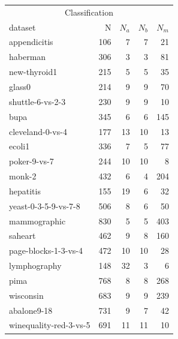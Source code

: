 \begin{tabular}{l@{\hspace{16pt}}r@{\hspace{16pt}}r@{\hspace{16pt}}r@{\hspace{16pt}}r}
\toprule
\multicolumn{5}{c}{Classification} \\
dataset & N & $N_a$ & $N_b$ & $N_m$ \\
\midrule
appendicitis & 106 & 7 & 7 & 21 \\
haberman & 306 & 3 & 3 & 81 \\
new-thyroid1 & 215 & 5 & 5 & 35 \\
glass0 & 214 & 9 & 9 & 70 \\
shuttle-6-vs-2-3 & 230 & 9 & 9 & 10 \\
bupa & 345 & 6 & 6 & 145 \\
cleveland-0-vs-4 & 177 & 13 & 10 & 13 \\
ecoli1 & 336 & 7 & 5 & 77 \\
poker-9-vs-7 & 244 & 10 & 10 & 8 \\
monk-2 & 432 & 6 & 4 & 204 \\
hepatitis & 155 & 19 & 6 & 32 \\
yeast-0-3-5-9-vs-7-8 & 506 & 8 & 6 & 50 \\
mammographic & 830 & 5 & 5 & 403 \\
saheart & 462 & 9 & 8 & 160 \\
page-blocks-1-3-vs-4 & 472 & 10 & 10 & 28 \\
lymphography & 148 & 32 & 3 & 6 \\
pima & 768 & 8 & 8 & 268 \\
wisconsin & 683 & 9 & 9 & 239 \\
abalone9-18 & 731 & 9 & 7 & 42 \\
winequality-red-3-vs-5 & 691 & 11 & 11 & 10 \\
\bottomrule
\end{tabular}
